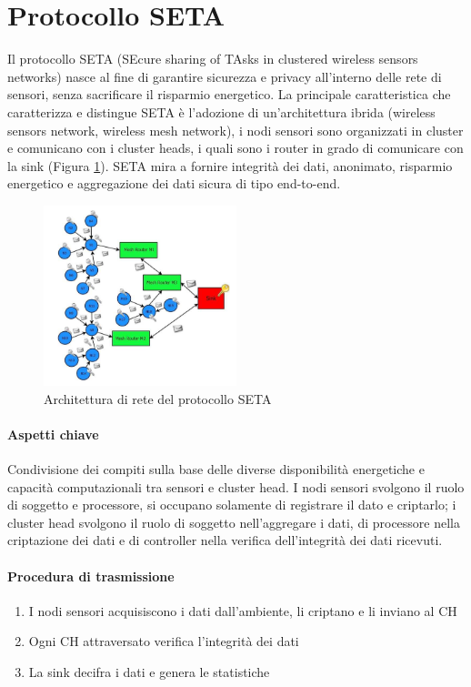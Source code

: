 \section{Protocollo SETA}

	Il protocollo SETA (SEcure sharing of TAsks in clustered wireless sensors networks) nasce al fine di garantire sicurezza e privacy all'interno delle rete di sensori, senza sacrificare il risparmio energetico.
	La principale caratteristica che caratterizza e distingue SETA è l'adozione di un'architettura ibrida (wireless sensors network, wireless mesh network), i nodi sensori sono organizzati in cluster e comunicano con i cluster heads, i quali sono i router in grado di comunicare con la sink (Figura \ref{fig:architetturaReteSETA}).
	SETA mira a fornire integrità dei dati, anonimato, risparmio energetico e aggregazione dei dati sicura di tipo end-to-end.
	
	\begin{figure}
		\centering
		\includegraphics[width=0.5\textwidth]{lez6-SETA/SETA_NetworkModel.png}
		\caption{Architettura di rete del protocollo SETA}
		\label{fig:architetturaReteSETA}
	\end{figure}
	
\paragraph{Aspetti chiave}
	Condivisione dei compiti sulla base delle diverse disponibilità energetiche e capacità computazionali tra sensori e cluster head.
	I nodi sensori svolgono il ruolo di soggetto e processore, si occupano solamente di registrare il dato e criptarlo;
	i cluster head svolgono il ruolo di soggetto nell'aggregare i dati, di processore nella criptazione dei dati e di controller nella verifica dell'integrità dei dati ricevuti.
	
\paragraph{Procedura di trasmissione}
	\begin{enumerate}
		\item I nodi sensori acquisiscono i dati dall'ambiente, li criptano e li inviano al CH
		\item Ogni CH attraversato verifica l'integrità dei dati
		\item La sink decifra i dati e genera le statistiche
	\end{enumerate}

